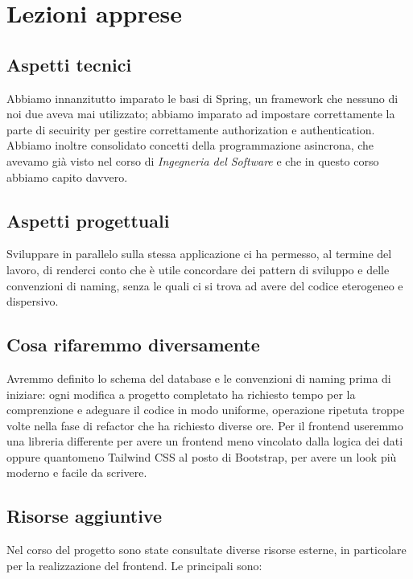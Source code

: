 \section{Lezioni apprese}

\subsection{Aspetti tecnici}
Abbiamo innanzitutto imparato le basi di Spring, un framework che nessuno di noi due aveva mai utilizzato; abbiamo imparato ad impostare correttamente la parte di secuirity per gestire correttamente authorization e authentication. Abbiamo inoltre consolidato concetti della programmazione asincrona, che avevamo già visto nel corso di \textit{Ingegneria del Software} e che in questo corso abbiamo capito davvero.

\subsection{Aspetti progettuali}
Sviluppare in parallelo sulla stessa applicazione ci ha permesso, al termine del lavoro, di renderci conto che è utile concordare dei pattern di sviluppo e delle convenzioni di naming, senza le quali ci si trova ad avere del codice eterogeneo e dispersivo.

\subsection{Cosa rifaremmo diversamente}
Avremmo definito lo schema del database e le convenzioni di naming prima di iniziare: ogni modifica a progetto completato ha richiesto tempo per la comprenzione e adeguare il codice in modo uniforme, operazione ripetuta troppe volte nella fase di refactor che ha richiesto diverse ore. Per il frontend useremmo una libreria differente per avere un frontend meno vincolato dalla logica dei dati oppure quantomeno Tailwind CSS al posto di Bootstrap, per avere un look più moderno e facile da scrivere.

\subsection{Risorse aggiuntive}
Nel corso del progetto sono state consultate diverse risorse esterne,
in particolare per la realizzazione del frontend. Le principali sono:

